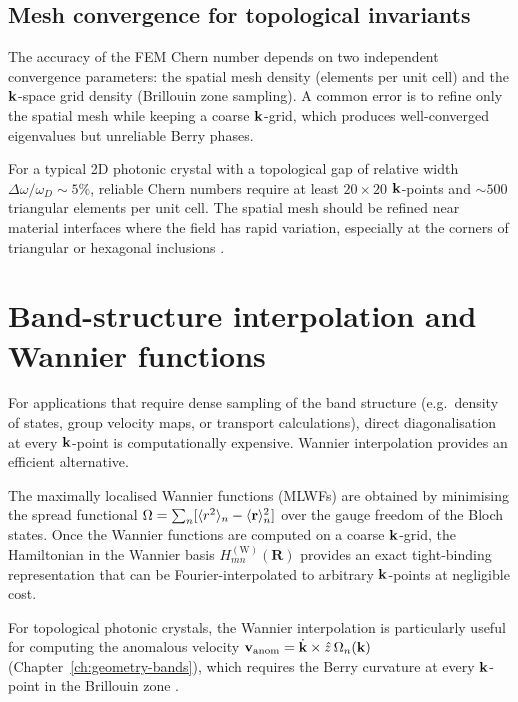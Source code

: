 \subsection{Mesh convergence for topological invariants}
\label{sec:appC-fem-convergence}

The accuracy of the FEM Chern number depends on two independent
convergence parameters: the spatial mesh density (elements per unit
cell) and the $\mathbf{k}$-space grid density (Brillouin zone sampling).
A common error is to refine only the spatial mesh while keeping a
coarse $\mathbf{k}$-grid, which produces well-converged eigenvalues but
unreliable Berry phases.

For a typical 2D photonic crystal with a topological gap of relative
width $\Delta\omega/\omega_D\sim 5\%$, reliable Chern numbers require
at least $20\times 20$ $\mathbf{k}$-points and $\sim 500$ triangular
elements per unit cell.  The spatial mesh should be refined near
material interfaces where the field has rapid variation, especially
at the corners of triangular or hexagonal inclusions
\cite{price2022roadmap}.

\section{Band-structure interpolation and Wannier functions}
\label{sec:appC-wannier}

For applications that require dense sampling of the band structure
(e.g.\ density of states, group velocity maps, or transport
calculations), direct diagonalisation at every $\mathbf{k}$-point is
computationally expensive.  Wannier interpolation provides an
efficient alternative.

The maximally localised Wannier functions (MLWFs) are obtained by
minimising the spread functional
$\Omega=\sum_n[\langle r^2\rangle_n-\langle\mathbf{r}\rangle_n^2]$
over the gauge freedom of the Bloch states.  Once the Wannier
functions are computed on a coarse $\mathbf{k}$-grid, the Hamiltonian
in the Wannier basis $H_{mn}^{(\mathrm{W})}(\mathbf{R})$ provides an
exact tight-binding representation that can be Fourier-interpolated
to arbitrary $\mathbf{k}$-points at negligible cost.

For topological photonic crystals, the Wannier interpolation is
particularly useful for computing the anomalous velocity
$\mathbf{v}_{\mathrm{anom}}=\dot{\mathbf{k}}\times\hat{z}\,\Omega_n(\mathbf{k})$
(Chapter~\ref{ch:geometry-bands}), which requires the Berry curvature
at every $\mathbf{k}$-point in the Brillouin zone
\cite{ozawa2018topological,asbth2016berry}.


